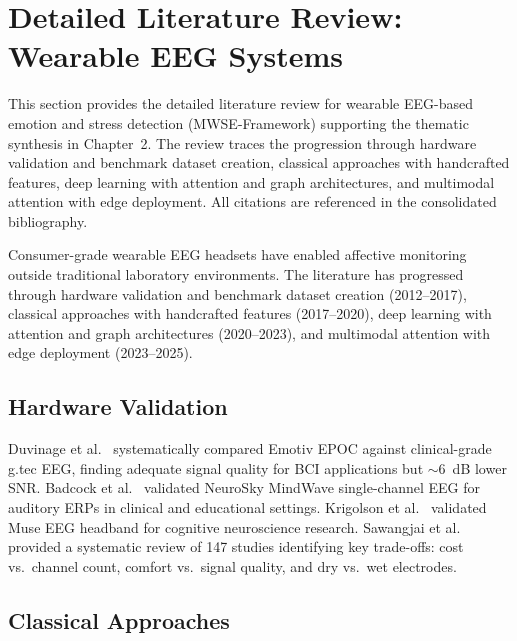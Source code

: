 
\section{Detailed Literature Review: Wearable EEG Systems}
\label{app:ch2_wearable}
\label{sec:topic6_wearable}

This section provides the detailed literature review for wearable EEG-based emotion and stress detection (MWSE-Framework) supporting the thematic synthesis in Chapter~2. The review traces the progression through hardware validation and benchmark dataset creation, classical approaches with handcrafted features, deep learning with attention and graph architectures, and multimodal attention with edge deployment. All citations are referenced in the consolidated bibliography.

Consumer-grade wearable EEG headsets have enabled affective monitoring outside traditional laboratory environments. The literature has progressed through hardware validation and benchmark dataset creation (2012--2017), classical approaches with handcrafted features (2017--2020), deep learning with attention and graph architectures (2020--2023), and multimodal attention with edge deployment (2023--2025).

\subsection{Hardware Validation}

Duvinage et al.~\cite{duvinage2013emotiv} systematically compared Emotiv EPOC against clinical-grade g.tec EEG, finding adequate signal quality for BCI applications but $\sim$6~dB lower SNR. Badcock et al.~\cite{badcock2013neurosky} validated NeuroSky MindWave single-channel EEG for auditory ERPs in clinical and educational settings. Krigolson et al.~\cite{krigolson2017muse} validated Muse EEG headband for cognitive neuroscience research. Sawangjai et al.~\cite{sawangjai2020consumer} provided a systematic review of 147 studies identifying key trade-offs: cost vs.\ channel count, comfort vs.\ signal quality, and dry vs.\ wet electrodes.

\subsection{Classical Approaches}

